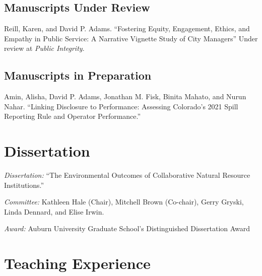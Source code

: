 \documentclass[12pt,letterpaper]{article}
\renewenvironment{itemize}{
  \begin{list}{}{
    \setlength{\leftmargin}{1.5em}
    \setlength{\itemsep}{0.25em}
    \setlength{\parskip}{0pt}
    \setlength{\parsep}{0.25em}
  }
}{
  \end{list}
}
\begin{document}
\subsection*{Manuscripts Under Review}
\begin{itemize}\leftmargin=2pt\itemindent=-15pt\leftmargin=2pt\itemindent=-15pt

    \item Reill, Karen, and David P. Adams. ``Fostering Equity, Engagement, Ethics, and Empathy in Public Service: A Narrative Vignette Study of City Managers'' Under review at \emph{Public Integrity}.
\end{itemize}

\subsection*{Manuscripts in Preparation}
\begin{itemize} \leftmargin=2pt\itemindent=-15pt\leftmargin=2pt\itemindent=-15pt
  \item Amin, Alisha, David P. Adams, Jonathan M. Fisk, Binita Mahato, and Nurun Nahar. ``Linking Disclosure to Performance: Assessing Colorado's 2021 Spill Reporting Rule and Operator Performance.''
\end{itemize}
  
\section*{Dissertation}
    \begin{itemize}\leftmargin=2pt\itemindent=-15pt\leftmargin=2pt\itemindent=-15pt
        \item \emph{Dissertation:} ``The Environmental Outcomes of Collaborative Natural Resource Institutions.'' 
        \item \emph{Committee:} Kathleen Hale (Chair), Mitchell Brown (Co-chair),
        Gerry Gryski, \\Linda Dennard, and Elise Irwin.
        \item \emph{Award:} Auburn University Graduate School's Distinguished Dissertation Award
    \end{itemize}
		
\section*{Teaching Experience}
\end{document}
